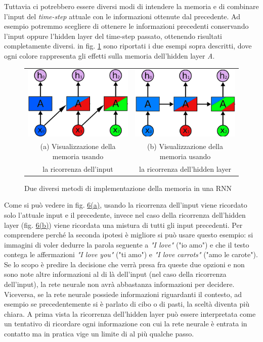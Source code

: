 Tuttavia ci potrebbero essere diversi modi di intendere la memoria e di combinare l'input del \textit{time-step} attuale con le informazioni ottenute dal precedente. Ad esempio potremmo scegliere di ottenere le informazioni precedenti conservando l'input oppure l'hidden layer del time-step passato, ottenendo risultati completamente diversi. in fig. \ref{fig:1.6} sono riportati i due esempi sopra descritti, dove ogni colore rappresenta gli effetti sulla memoria dell'hidden layer \textit{A}.
\begin{figure}[h]
	\centering
	\begin{tabular}{cc}
		\includegraphics[width=0.4\linewidth]{img/input_memory.png} &
		\includegraphics[width=0.4\linewidth]{img/hidden_memory.png} \\
		\footnotesize (a) Visualizzazione della memoria usando & \footnotesize (b) Visualizzazione della memoria usando \\ \footnotesize la ricorrenza dell'input & \footnotesize la ricorrenza dell'hidden layer
	\end{tabular}
	\caption{Due diversi metodi di implementazione della memoria in una RNN}
	\label{fig:1.6}
\end{figure}

Come si può vedere in fig. \hyperref[fig:1.6]{6(a)}, usando la ricorrenza dell'input viene ricordato solo l'attuale input e il precedente, invece nel caso della ricorrenza dell'hidden layer (fig. \hyperref[fig:1.6]{6(b)}) viene ricordata una mistura di tutti gli input precedenti. Per comprendere perché la seconda ipotesi è migliore si può usare questo esempio: si immagini di voler dedurre la parola seguente a \textit{"I love"} ("io amo") e che il testo contega le affermazioni \textit{"I love you"} ("ti amo") e \textit{"I love carrots"} ("amo le carote"). Se lo scopo è predire la decisione che verrà presa fra queste due opzioni e non sono note altre informazioni al di là dell'input (nel caso della ricorrenza dell'input), la rete neurale non avrà abbastanza informazioni per decidere. Viceversa, se la rete neurale possiede informazioni riguardanti il contesto, ad esempio se precedentemente si è parlato di cibo o di pasti, la sceltà diventa più chiara. A prima vista la ricorrenza dell'hidden layer può essere interpretata come un tentativo di ricordare ogni informazione con cui la rete neurale è entrata in contatto ma in pratica vige un limite di al più qualche passo.

